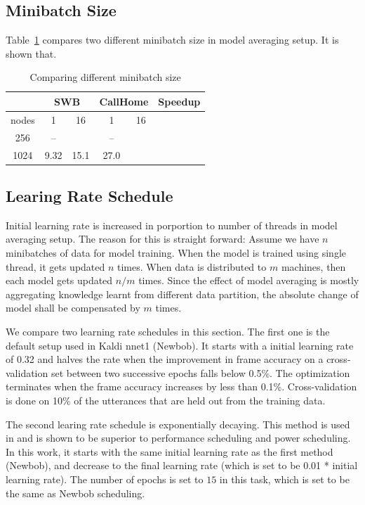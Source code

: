 \documentclass{article}
\begin{document}
\subsection{Minibatch Size}
Table~\ref{tab:mbsize} compares two different minibatch size in model averaging setup. It is shown that.
\begin{table}
  \centering
  \begin{tabular}{c|c|c|c|c|c}
    \hline
    & \multicolumn{2}{c|}{SWB}    & \multicolumn{2}{c|}{CallHome} & Speedup\\
    \hline
    nodes       &  1    &   16    &    1     &   16   &    \\
    \hline
    256         &  --      &      &  --      &        & \\
    \hline
    1024        & 9.32     & 15.1 & 27.0     &        & \\
    \hline
  \end{tabular}
  \caption{Comparing different minibatch size}
  \label{tab:mbsize}
\end{table}

\subsection{Learing Rate Schedule}
Initial learning rate is increased in porportion to number of threads in model averaging setup. The reason for this is straight 
forward:
Assume we have $n$ minibatches of data for model training. When the model is trained using single thread, it gets updated $n$
times. When data is distributed to $m$ machines, then each model gets updated $n/m$ times. Since the effect of model averaging 
is mostly aggregating knowledge learnt from different data partition, the absolute change of model shall be compensated by 
$m$ times.

We compare two learning rate schedules in this section. The first one is the default setup used in Kaldi nnet1 (Newbob). 
It starts with a initial learning rate of 0.32 and halves the rate when the improvement in frame accuracy on a cross-validation 
set between two successive epochs falls below 0.5\%. The optimization terminates when the frame accuracy increases by less 
than 0.1\%. Cross-validation is done on 10\% of the utterances that are held out from the training data.

The second learing rate schedule is exponentially decaying. This method is used in \cite{senior2013empirical,povey2014parallel} 
and is shown to be superior to performance scheduling and power scheduling. In this work, it starts with the same initial learning
rate as the first method (Newbob), and decrease to the final learning rate (which is set to be 0.01 * initial learning rate). The
number of epochs is set to $15$ in this task, which is set to be the same as Newbob scheduling.
\end{document}
